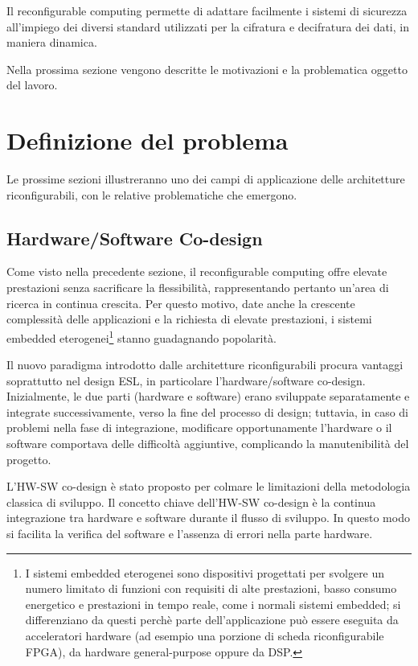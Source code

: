 Il reconfigurable computing permette di adattare facilmente i sistemi di sicurezza
all'impiego dei diversi standard utilizzati per la cifratura e decifratura dei dati, in
maniera dinamica.

Nella prossima sezione vengono descritte le motivazioni e la problematica oggetto del
lavoro.

\section{Definizione del problema}
\label{sec:definizioneProblema}
Le prossime sezioni illustreranno uno dei campi di applicazione delle architetture
riconfigurabili, con le relative problematiche che emergono.

\subsection{Hardware/Software Co-design}
Come visto nella precedente sezione, il reconfigurable computing offre elevate
prestazioni senza sacrificare la flessibilità, rappresentando pertanto un'area di
ricerca in continua crescita. Per questo motivo, date anche la crescente complessità
delle applicazioni e la richiesta di elevate prestazioni, i sistemi embedded
eterogenei\footnote{I sistemi embedded eterogenei sono dispositivi progettati per
svolgere un numero limitato di funzioni con requisiti di alte prestazioni, basso consumo
energetico e prestazioni in tempo reale, come i normali sistemi embedded; si
differenziano da questi perchè parte dell'applicazione può essere eseguita da
acceleratori hardware (ad esempio una porzione di scheda riconfigurabile FPGA), da
hardware general-purpose oppure da \ac{DSP}.} stanno guadagnando popolarità.

Il nuovo paradigma introdotto dalle architetture riconfigurabili procura vantaggi
soprattutto nel design \ac{ESL}, in particolare l'\mbox{hardware/software} co-design.
Inizialmente, le due parti (hardware e software) erano sviluppate separatamente e integrate
successivamente, verso la fine del processo di design; tuttavia, in caso di problemi nella fase di
integrazione, modificare opportunamente l'hardware o il software comportava delle difficoltà
aggiuntive, complicando la manutenibilità del progetto.

L'HW-SW co-design è stato proposto per colmare le limitazioni della metodologia classica di
sviluppo. Il concetto chiave dell'HW-SW co-design è la continua integrazione tra hardware e software
durante il flusso di sviluppo. In questo modo si facilita la verifica del software e l'assenza di
errori nella parte hardware.


